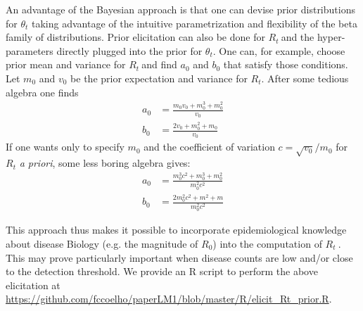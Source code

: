 \documentclass[10pt]{article}
\def \rr {$R_{t}\:$}
\begin{document}
An advantage of the Bayesian approach is that one can devise prior 
distributions for $\theta_t$ taking advantage of the intuitive parametrization 
and flexibility of the beta family of distributions.
Prior elicitation can also be done for \rr and the hyper-parameters directly 
plugged into the prior for $\theta_t$. 
One can, for example, choose prior mean and variance for \rr and find $a_0$ 
and $b_0$ that satisfy those conditions.
Let $m_0$ and $v_0$ be the prior expectation and variance for $R_t$. 
After some tedious algebra one finds
\begin{align}
\label{seq:elicitation}
a_0 &= \frac{m_0v_0 + m_0^3 + m_0^2}{v_0} \\
b_0 &= \frac{2v_0 + m_0^2 + m_0}{v_0}
\end{align}
If one wants only to specify $m_0$ and the coefficient of variation $c = 
\sqrt{v_0}/ m_0$ for $R_t$ \textit{a priori}, some less boring 
algebra gives:
\begin{align}
\label{seq:elicitationcv}
a_0 &= \frac{m_0^3c^2 + m_0^3 + m_0^2}{m_0^2c^2} \\
b_0 &= \frac{2m_0^2c^2 + m^2 + m}{m_0^2c^2}
\end{align}

This approach thus makes it possible to incorporate epidemiological knowledge 
about disease Biology (e.g. the magnitude of $R_0$) into the computation of \rr.
This may prove particularly important when disease counts are low and/or close 
to the detection threshold.
We provide an R script to perform the above elicitation at 
\url{https://github.com/fccoelho/paperLM1/blob/master/R/elicit_Rt_prior.R}.
\end{document}
